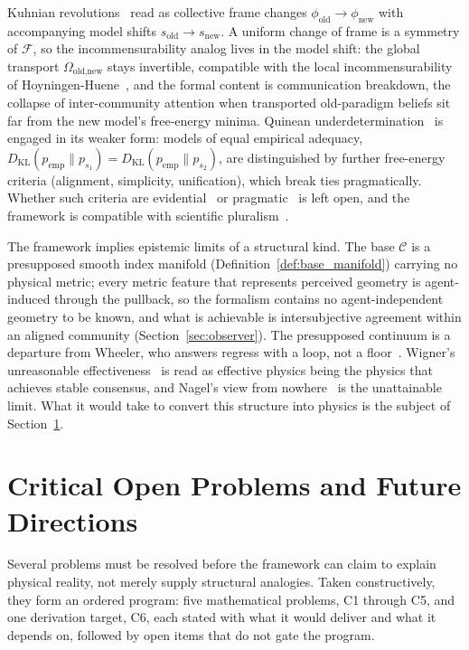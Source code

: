 \documentclass[11pt]{article}
\begin{document}
Kuhnian revolutions~\cite{Kuhn1962} read as collective frame changes $\phi_{\text{old}} \to \phi_{\text{new}}$ with accompanying model shifts $s_{\text{old}} \to s_{\text{new}}$. A uniform change of frame is a symmetry of $\mathcal{F}$, so the incommensurability analog lives in the model shift: the global transport $\Omega_{\text{old,new}}$ stays invertible, compatible with the local incommensurability of Hoyningen-Huene~\cite{Hoyningen-Huene1993}, and the formal content is communication breakdown, the collapse of inter-community attention when transported old-paradigm beliefs sit far from the new model's free-energy minima. Quinean underdetermination~\cite{Quine1951, Quine1975} is engaged in its weaker form: models of equal empirical adequacy, $D_{\mathrm{KL}}(p_{\mathrm{emp}} \| p_{s_1}) = D_{\mathrm{KL}}(p_{\mathrm{emp}} \| p_{s_2})$, are distinguished by further free-energy criteria (alignment, simplicity, unification), which break ties pragmatically. Whether such criteria are evidential~\cite{LaudanLeplin1991} or pragmatic~\cite{vanFraassen1980} is left open, and the framework is compatible with scientific pluralism~\cite{Longino2002}.

The framework implies epistemic limits of a structural kind. The base $\mathcal{C}$ is a presupposed smooth index manifold (Definition~\ref{def:base_manifold}) carrying no physical metric; every metric feature that represents perceived geometry is agent-induced through the pullback, so the formalism contains no agent-independent geometry to be known, and what is achievable is intersubjective agreement within an aligned community (Section~\ref{sec:observer}). The presupposed continuum is a departure from Wheeler, who answers regress with a loop, not a floor~\cite{Wheeler1990}. Wigner's unreasonable effectiveness~\cite{Wigner1960} is read as effective physics being the physics that achieves stable consensus, and Nagel's view from nowhere~\cite{Nagel1986} is the unattainable limit. What it would take to convert this structure into physics is the subject of Section~\ref{sec:open_problems}.

\section{Critical Open Problems and Future Directions}\label{sec:open_problems}

Several problems must be resolved before the framework can claim to explain physical reality, not merely supply structural analogies. Taken constructively, they form an ordered program: five mathematical problems, C1 through C5, and one derivation target, C6, each stated with what it would deliver and what it depends on, followed by open items that do not gate the program.
\end{document}
